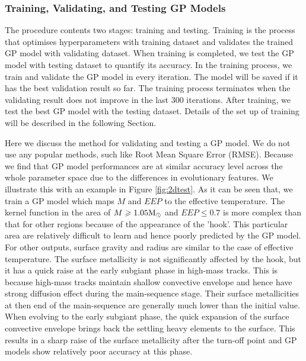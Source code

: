 \subsubsection{Training, Validating, and Testing GP Models}\label{sec:training}

The procedure contents two stages: training and testing.  
Training is the process that optimises hyperparameters with training dataset and validates the trained GP model with validating dataset. When training is completed, we test the GP model with testing dataset to quantify its accuracy.  
%
In the training process, we train and validate the GP model in every iteration. The model will be saved if it has the best validation result so far. The training process terminates when the validating result does not improve in the last 300 iterations. After training, we test the best GP model with the testing dataset. Details of the set up of training will be described in the following Section. 

Here we discuss the method for validating and testing a GP model. We do not use any popular methods, such like Root Mean Square Error (RMSE). Because we find that GP model performances are at similar accuracy level across the whole parameter space due to the differences in evolutionary features. We illustrate this with an example in Figure \ref{fig:2dtest}. As it can be seen that, we train a GP model which maps $M$ and $EEP$ to the effective temperature. The kernel function in the area of $M \geq 1.05 {\rm M_{\odot}}$ and $EEP \leq 0.7$ is more complex than that for other regions because of the appearance of the 'hook'. This particular area are relatively difficult to learn and hence poorly predicted by the GP model.
%
For other outputs, surface gravity and radius are similar to the case of effective temperature. The surface metallicity is not significantly affected by the hook, but it has a quick raise at the early subgiant phase in high-mass tracks. This is because high-mass tracks maintain shallow convective envelope and hence have strong diffusion effect during the main-sequence stage. Their surface metallicities at then end of the main-sequence are generally much lower than the initial value. When evolving to the early subgiant phase, the quick expansion of the surface convective envelope brings back the settling heavy elements to the surface. This results in a sharp raise of the surface metallicity after the turn-off point and GP models show relatively poor accuracy at this phase. 
%

